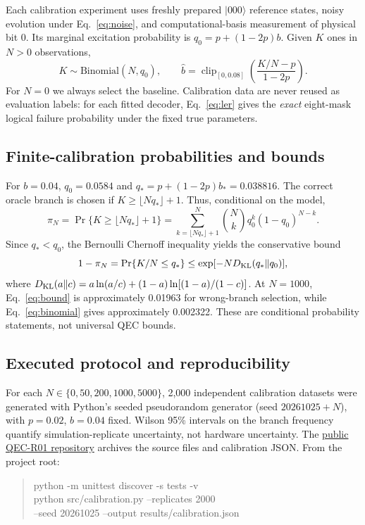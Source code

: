 \documentclass[11pt,a4paper]{article}
\begin{document}
Each calibration experiment uses freshly prepared $|000\rangle$ reference states, noisy evolution under Eq.~\eqref{eq:noise}, and computational-basis measurement of physical bit 0. Its marginal excitation probability is $q_0=p+(1-2p)b$. Given $K$ ones in $N>0$ observations,
\begin{equation}
 K\sim\mathrm{Binomial}(N,q_0),\qquad \hat b=\operatorname{clip}_{[0,0.08]}\left(\frac{K/N-p}{1-2p}\right).
 \label{eq:estimator}
\end{equation}
For $N=0$ we always select the baseline. Calibration data are never reused as evaluation labels: for each fitted decoder, Eq.~\eqref{eq:ler} gives the \emph{exact} eight-mask logical failure probability under the fixed true parameters.

\subsection{Finite-calibration probabilities and bounds}
For $b=0.04$, $q_0=0.0584$ and $q_*=p+(1-2p)b_*=0.038816$. The correct oracle branch is chosen if $K\ge\lfloor Nq_*\rfloor+1$. Thus, conditional on the model,
\begin{equation}
 \pi_N=\Pr\{K\ge\lfloor Nq_*\rfloor+1\}
 =\sum_{k=\lfloor Nq_*\rfloor+1}^{N}\binom Nk q_0^k(1-q_0)^{N-k}.
 \label{eq:binomial}
\end{equation}
Since $q_*<q_0$, the Bernoulli Chernoff inequality yields the conservative bound
\begin{equation}
 1-\pi_N=\Pr\{K/N\le q_*\}\le\exp[-N D_{\rm KL}(q_*\Vert q_0)],
 \label{eq:bound}
\end{equation}
where $D_{\rm KL}(a\Vert c)=a\ln(a/c)+(1-a)\ln[(1-a)/(1-c)]$. At $N=1000$, Eq.~\eqref{eq:bound} is approximately 0.01963 for wrong-branch selection, while Eq.~\eqref{eq:binomial} gives approximately 0.002322. These are conditional probability statements, not universal QEC bounds.

\subsection{Executed protocol and reproducibility}
For each $N\in\{0,50,200,1000,5000\}$, 2,000 independent calibration datasets were generated with Python's seeded pseudorandom generator (seed $20261025+N$), with $p=0.02$, $b=0.04$ fixed. Wilson 95\% intervals on the branch frequency quantify simulation-replicate uncertainty, not hardware uncertainty. The \href{https://github.com/Vahiff/qec-r01-public}{public QEC-R01 repository} archives the source files and calibration JSON. From the project root:
\begin{quote}\ttfamily\small
python -m unittest discover -s tests -v\\
python src/calibration.py --replicates 2000\\
--seed 20261025 --output results/calibration.json
\end{quote}
\end{document}
